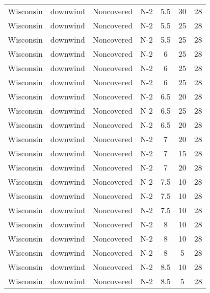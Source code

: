 \documentclass{article}
\begin{document}
\begin{longtable}[c]{ccccccc}
Wisconsin & downwind  & Noncovered & N-2             & 5.5          & 30          & 28  \\
Wisconsin & downwind  & Noncovered & N-2             & 5.5          & 25          & 28  \\
Wisconsin & downwind  & Noncovered & N-2             & 5.5          & 25          & 28  \\
Wisconsin & downwind  & Noncovered & N-2             & 6            & 25          & 28  \\
Wisconsin & downwind  & Noncovered & N-2             & 6            & 25          & 28  \\
Wisconsin & downwind  & Noncovered & N-2             & 6            & 25          & 28  \\
Wisconsin & downwind  & Noncovered & N-2             & 6.5          & 20          & 28  \\
Wisconsin & downwind  & Noncovered & N-2             & 6.5          & 25          & 28  \\
Wisconsin & downwind  & Noncovered & N-2             & 6.5          & 20          & 28  \\
Wisconsin & downwind  & Noncovered & N-2             & 7            & 20          & 28  \\
Wisconsin & downwind  & Noncovered & N-2             & 7            & 15          & 28  \\
Wisconsin & downwind  & Noncovered & N-2             & 7            & 20          & 28  \\
Wisconsin & downwind  & Noncovered & N-2             & 7.5          & 10          & 28  \\
Wisconsin & downwind  & Noncovered & N-2             & 7.5          & 10          & 28  \\
Wisconsin & downwind  & Noncovered & N-2             & 7.5          & 10          & 28  \\
Wisconsin & downwind  & Noncovered & N-2             & 8            & 10          & 28  \\
Wisconsin & downwind  & Noncovered & N-2             & 8            & 10          & 28  \\
Wisconsin & downwind  & Noncovered & N-2             & 8            & 5           & 28  \\
Wisconsin & downwind  & Noncovered & N-2             & 8.5          & 10          & 28  \\
Wisconsin & downwind  & Noncovered & N-2             & 8.5          & 5           & 28  \\

\end{longtable}
\end{document}
